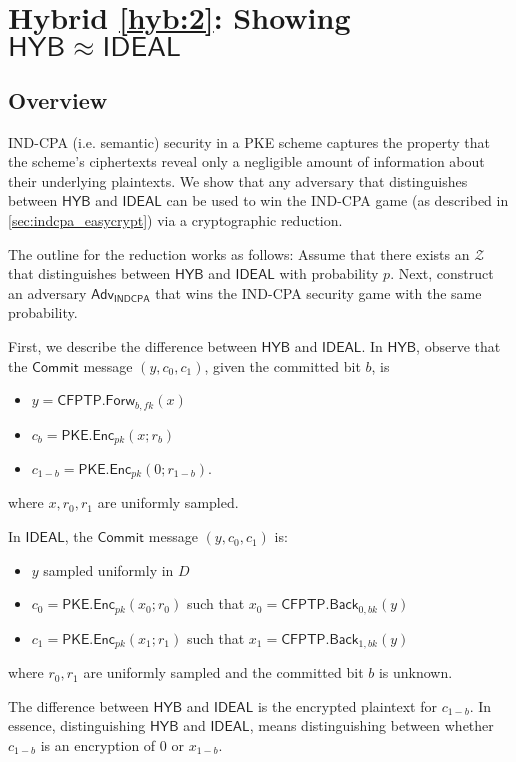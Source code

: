 \documentclass{article}[12pt]
\newcommand{\CommitMsg}{\mathsf{Commit}}
\newcommand{\PKE}{\mathsf{PKE}}
\newcommand{\Enc}{\mathsf{Enc}}
\newcommand{\Indcpa}{\mathsf{INDCPA}}
\newcommand{\EncKey}{{pk}}
\newcommand{\CFPTP}{\mathsf{CFPTP}}
\newcommand{\Forw}{\mathsf{Forw}}
\newcommand{\Back}{\mathsf{Back}}
\newcommand{\ForwKey}{{fk}}
\newcommand{\BackKey}{{bk}}
\newcommand{\Domain}{D}
\newcommand{\Adversary}{{\mathsf{Adv}}} %
\newcommand{\Environment}{{\mathcal{Z}}} %
\newcommand{\IndcpaAdversary}{{\Adversary_\Indcpa}}
\newcommand{\Ideal}{{\mathsf{IDEAL}}}
\newcommand{\Hyb}{{\mathsf{HYB}}}
\begin{document}
\section{Hybrid \ref{hyb:2}: Showing $\Hyb \approx \Ideal$}

\subsection{Overview}\label{sec:indcpa_overview}
IND-CPA (i.e. semantic) security in a PKE scheme captures the property that the scheme's ciphertexts reveal only a negligible amount of information about their underlying plaintexts. We show that any adversary that distinguishes between $\Hyb$ and $\Ideal$ can be used to win the IND-CPA game (as described in \cref{sec:indcpa_easycrypt}) via a cryptographic reduction.

The outline for the reduction works as follows: Assume that there exists an $\Environment$ that distinguishes between $\Hyb$ and $\Ideal$ with probability $p$. Next, construct an adversary $\IndcpaAdversary$ that wins the IND-CPA security game with the same probability.

First, we describe the difference between $\Hyb$ and $\Ideal$. In $\Hyb$, observe that the $\CommitMsg$ message $(y, c_0, c_1)$, given the committed bit $b$, is
\begin{itemize}
	\item $y = \CFPTP.\Forw_{b, \ForwKey}(x)$
	\item $c_b = \PKE.\Enc_\EncKey(x; r_b)$
	\item $c_{1-b} = \PKE.\Enc_\EncKey(0; r_{1-b})$.
\end{itemize}
where $x, r_0, r_1$ are uniformly sampled.

In $\Ideal$, the $\CommitMsg$ message $(y, c_0, c_1)$ is:
\begin{itemize}
	\item $y$ sampled uniformly in $\Domain$
	\item $c_0 = \PKE.\Enc_\EncKey(x_0; r_0)$ such that $x_0 = \CFPTP.\Back_{0, \BackKey}(y)$
	\item $c_1 = \PKE.\Enc_\EncKey(x_1; r_1)$ such that $x_1 = \CFPTP.\Back_{1, \BackKey}(y)$
\end{itemize}
where $r_0, r_1$ are uniformly sampled and the committed bit $b$ is unknown.

The difference between $\Hyb$ and $\Ideal$ is the encrypted plaintext for $c_{1-b}$. In essence, distinguishing $\Hyb$ and $\Ideal$, means distinguishing between whether $c_{1-b}$ is an encryption of $0$ or $x_{1-b}$.
\end{document}
